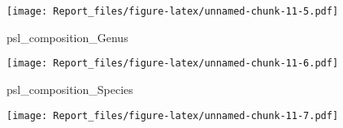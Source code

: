 \documentclass[]{article}
\newenvironment{Shaded}{\begin{snugshade}}{\end{snugshade}}
\newcommand{\NormalTok}[1]{#1}
\begin{document}
\texttt{[image: Report\_files/figure-latex/unnamed-chunk-11-5.pdf]}

\begin{Shaded}
\begin{Highlighting}[]
\NormalTok{psl_composition_Genus}
\end{Highlighting}
\end{Shaded}

\texttt{[image: Report\_files/figure-latex/unnamed-chunk-11-6.pdf]}

\begin{Shaded}
\begin{Highlighting}[]
\NormalTok{psl_composition_Species}
\end{Highlighting}
\end{Shaded}

\texttt{[image: Report\_files/figure-latex/unnamed-chunk-11-7.pdf]}
\end{document}
